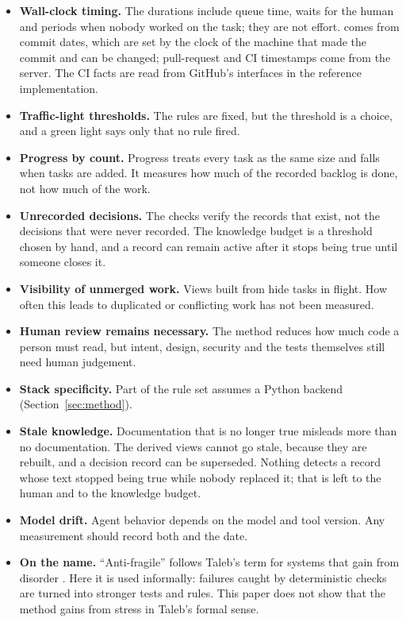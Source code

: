 \documentclass[11pt,a4paper]{article}
\newcommand{\code}[1]{\path{#1}}
\begin{document}
\begin{itemize}
  \item \textbf{Wall-clock timing.} The durations include queue time, waits for the human and periods when nobody worked on the task; they are not effort. \code{started_at} comes from commit dates, which are set by the clock of the machine that made the commit and can be changed; pull-request and CI timestamps come from the server. The CI facts are read from GitHub's interfaces in the reference implementation.
  \item \textbf{Traffic-light thresholds.} The rules are fixed, but the threshold \code{stale_days} is a choice, and a green light says only that no rule fired.
  \item \textbf{Progress by count.} Progress treats every task as the same size and falls when tasks are added. It measures how much of the recorded backlog is done, not how much of the work.
  \item \textbf{Unrecorded decisions.} The checks verify the records that exist, not the decisions that were never recorded. The knowledge budget is a threshold chosen by hand, and a record can remain active after it stops being true until someone closes it.
  \item \textbf{Visibility of unmerged work.} Views built from \code{origin/main} hide tasks in flight. How often this leads to duplicated or conflicting work has not been measured.
  \item \textbf{Human review remains necessary.} The method reduces how much code a person must read, but intent, design, security and the tests themselves still need human judgement.
  \item \textbf{Stack specificity.} Part of the rule set assumes a Python backend (Section~\ref{sec:method}).
  \item \textbf{Stale knowledge.} Documentation that is no longer true misleads more than no documentation. The derived views cannot go stale, because they are rebuilt, and a decision record can be superseded. Nothing detects a record whose text stopped being true while nobody replaced it; that is left to the human and to the knowledge budget.
  \item \textbf{Model drift.} Agent behavior depends on the model and tool version. Any measurement should record both and the date.
  \item \textbf{On the name.} ``Anti-fragile'' follows Taleb's term for systems that gain from disorder \cite{taleb2012}. Here it is used informally: failures caught by deterministic checks are turned into stronger tests and rules. This paper does not show that the method gains from stress in Taleb's formal sense.
\end{itemize}
\end{document}
